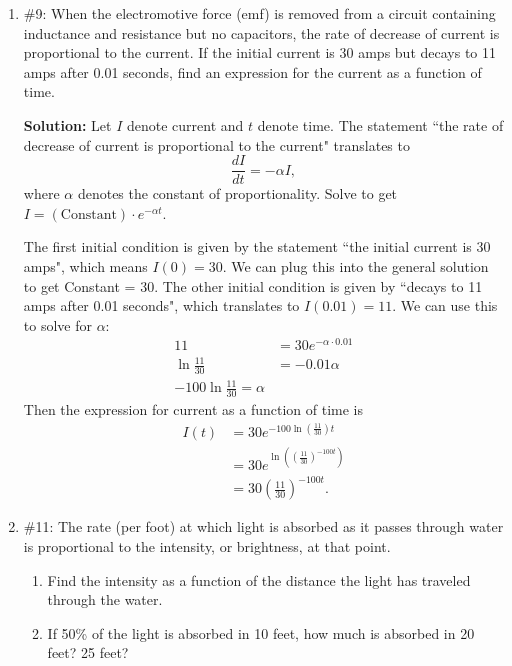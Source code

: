 \documentclass[11pt,letterpaper]{article}
\begin{document}
\begin{enumerate}
\item \#9: When the electromotive force (emf) is removed from a circuit containing inductance and resistance but no capacitors, the rate of decrease of current is proportional to the current.  If the initial current is 30 amps but decays to 11 amps after 0.01 seconds, find an expression for the current as a function of time.

{\bf Solution:} Let $I$ denote current and $t$ denote time.  The statement ``the rate of decrease of current is proportional to the current" translates to 
\[\frac{dI}{dt}=-\alpha I,\]
where $\alpha$ denotes the constant of proportionality.  Solve to get $I=(\text{Constant})\cdot e^{-\alpha t}$.

The first initial condition is given by the statement ``the initial current is 30 amps", which means $I(0)=30$.  We can plug this into the general solution to get Constant = 30.  The other initial condition is given by ``decays to 11 amps after 0.01 seconds", which translates to $I(0.01)=11$.  We can use this to solve for $\alpha$:
\begin{align*}
11 &= 30e^{-\alpha\cdot0.01} \\
\ln\frac{11}{30} &= -0.01\alpha \\
-100\ln\frac{11}{30}=\alpha
\end{align*}
Then the expression for current as a function of time is
\begin{align*}
I(t) &= 30e^{-100\ln\left(\frac{11}{30}\right)t} \\
&= 30e^{\ln\left(\left(\frac{11}{30}\right)^{-100t}\right)} \\
&= 30\left(\frac{11}{30}\right)^{-100t}.
\end{align*}

\item \#11: The rate (per foot) at which light is absorbed as it passes through water is proportional to the intensity, or brightness, at that point.
\begin{enumerate}
\item Find the intensity as a function of the distance the light has traveled through the water.
\item If 50\% of the light is absorbed in 10 feet, how much is absorbed in 20 feet?  25 feet?
\end{enumerate}


\end{enumerate}
\end{document}
